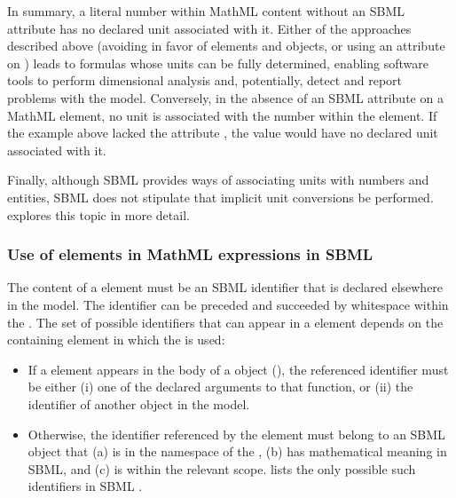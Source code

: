In summary, a literal number within MathML content without an SBML
 attribute has no declared unit associated with it.
Either of the approaches described above (\ie avoiding 
in favor of  elements and \Parameter objects, or using
an  attribute on ) leads to formulas
whose units can be fully determined, enabling software tools to
perform dimensional analysis and, potentially, detect and report
problems with the model.  Conversely, in the absence of an SBML
 attribute on a MathML  element, no unit is
associated with the number within the  element.  If the
example above lacked the attribute , the value
 would have no declared unit associated with it.

Finally, although SBML provides ways of associating units with
numbers and entities, SBML does not stipulate that implicit unit
conversions be performed.
 explores this topic in
more detail.


\reltwo{\vspace*{0.5ex}}
\subsubsection{Use of  elements in MathML expressions in SBML}
\label{sec:ci-token}

The content of a  element must be an SBML identifier
that is declared elsewhere in the model.  The identifier can be
preceded and succeeded by whitespace within the .  The
set of possible identifiers that can appear in a 
element depends on the containing element in which the 
is used:
\begin{itemize}
  
\item If a  element appears in the  body of
  a \FunctionDefinition object
  (), the referenced
  identifier must be either (i) one of the declared arguments to
  that function, or (ii) the identifier of another
  \FunctionDefinition object in the model.
  
\item Otherwise, the identifier referenced by the 
  element must belong to 
  {an SBML object that (a) is in the  namespace of the \Model, (b) has mathematical meaning in SBML, and (c) is within the relevant scope.   lists the only possible such identifiers in SBML \thisLV.}

\end{itemize}

